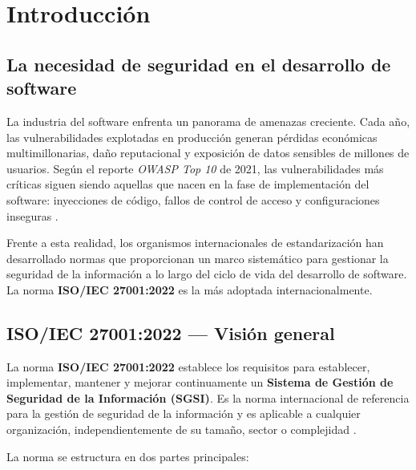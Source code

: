 \section{Introducción}

\subsection{La necesidad de seguridad en el desarrollo de software}

La industria del software enfrenta un panorama de amenazas creciente. Cada año, las vulnerabilidades explotadas en producción generan pérdidas económicas multimillonarias, daño reputacional y exposición de datos sensibles de millones de usuarios. Según el reporte \textit{OWASP Top 10} de 2021, las vulnerabilidades más críticas siguen siendo aquellas que nacen en la fase de implementación del software: inyecciones de código, fallos de control de acceso y configuraciones inseguras \cite{owasp2021}.

Frente a esta realidad, los organismos internacionales de estandarización han desarrollado normas que proporcionan un marco sistemático para gestionar la seguridad de la información a lo largo del ciclo de vida del desarrollo de software. La norma \textbf{ISO/IEC 27001:2022} es la más adoptada internacionalmente.

\subsection{ISO/IEC 27001:2022 --- Visión general}

La norma \textbf{ISO/IEC 27001:2022} establece los requisitos para establecer, implementar, mantener y mejorar continuamente un \textbf{Sistema de Gestión de Seguridad de la Información (SGSI)}. Es la norma internacional de referencia para la gestión de seguridad de la información y es aplicable a cualquier organización, independientemente de su tamaño, sector o complejidad \cite{nist800218}.

La norma se estructura en dos partes principales:

